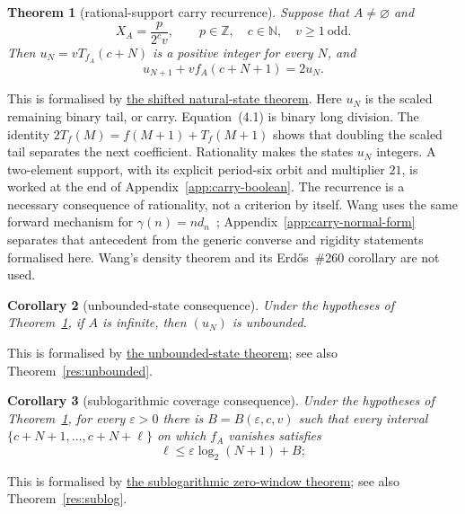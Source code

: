 \documentclass[11pt]{article}
\newcommand{\commit}{ebc98ee71f6819bd9fe344a0bb343542c604e533}
\newcommand{\repobase}{https://github.com/wcook04/plectis-lean-erdos249-257/blob/\commit}
\newcommand{\PK}{Erdos249257}
\newcommand{\lword}[4]{\href{\repobase/\PK/#1\#L#2}{#4}}
\newtheorem{theorem}{Theorem}[section]
\newtheorem{corollary}[theorem]{Corollary}
\theoremstyle{definition}
\theoremstyle{remark}
\newcommand{\N}{\mathbb{N}}
\newcommand{\Z}{\mathbb{Z}}
\begin{document}
\begin{theorem}[rational-support carry recurrence]\label{res:rigidity-main}
Suppose that \(A\neq\varnothing\) and
\[
 X_A=\frac{p}{2^c v},
 \qquad p\in\Z,\quad c\in\N,\quad v\geq1\ \text{odd}.
\]
Then \(u_N=vT_{f_A}(c+N)\) is a positive integer for every \(N\), and
\[
 u_{N+1}+v f_A(c+N+1)=2u_N. \tag{4.1}
\]
\end{theorem}
\noindent This is formalised by
\lword{RationalSupportCarrySkeleton.lean}{668}{exists_shifted_odd_tail_nat_states_of_support_fraction}{the shifted natural-state theorem}.
Here \(u_N\) is the scaled remaining binary tail, or carry.
Equation~\textup{(4.1)} is binary long division.  The identity
\(2T_f(M)=f(M+1)+T_f(M+1)\) shows that doubling the scaled tail separates the
next coefficient.  Rationality makes the states \(u_N\) integers.
A two-element
support, with its explicit period-six orbit and multiplier \(21\), is worked
at the end of Appendix~\ref{app:carry-boolean}.
The recurrence is a necessary consequence of rationality, not a criterion by
itself.  Wang uses the same forward mechanism for
\(\gamma(n)=n d_n\)~\cite[Section~3]{wang2026}; Appendix~\ref{app:carry-normal-form}
separates that antecedent from the generic converse and rigidity statements
formalised here.  Wang's density theorem and its Erd\H{o}s~\#260 corollary
are not used.

\begin{corollary}[unbounded-state consequence]
\label{res:rigidity-unbounded-main}
Under the hypotheses of Theorem~\ref{res:rigidity-main}, if \(A\) is
infinite, then \((u_N)\) is unbounded.
\end{corollary}
\noindent This is formalised by
\lword{RationalSupportCarrySkeleton.lean}{2377}{exists_unbounded_shifted_odd_tail_nat_state_of_support_fraction}{the unbounded-state theorem};
see also Theorem~\ref{res:unbounded}.

\begin{corollary}[sublogarithmic coverage consequence]
\label{res:rigidity-sublog-main}
Under the hypotheses of Theorem~\ref{res:rigidity-main}, for every
\(\varepsilon>0\) there is
\(B=B(\varepsilon,c,v)\) such that every interval
\(\{c+N+1,\ldots,c+N+\ell\}\) on which \(f_A\) vanishes satisfies
\[
 \ell\leq\varepsilon\log_2(N+1)+B;
\]
\end{corollary}
\noindent This is formalised by
\lword{SublogDivisorCoverage.lean}{392}{supportCoeffZeroWindow_length_le_eps_logb_add}{the sublogarithmic zero-window theorem};
see also Theorem~\ref{res:sublog}.
\end{document}
